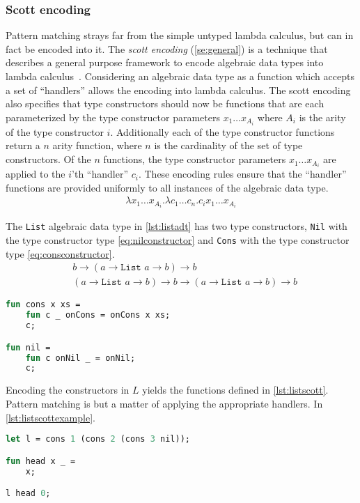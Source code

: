 \documentclass[11pt,oneside,a4paper]{report}
\begin{document}
\subsubsection{Scott encoding}
Pattern matching strays far from the simple untyped lambda calculus, but can in fact be encoded into it.
The \textit{scott encoding} (\autoref{se:general}) is a technique that describes a general purpose framework to encode algebraic data types into lambda calculus~\cite{scott1962system}.
Considering an algebraic data type as a function which accepts a set of ``handlers'' allows the encoding into lambda calculus.
The scott encoding  also specifies that type constructors should now be functions that are each parameterized by the type constructor parameters $x_1 \dots x_{A_i}$ where $A_i$ is the arity of the type constructor $i$.
Additionally each of the type constructor functions return a $n$ arity function, where $n$ is the cardinality of the set of type constructors.
Of the $n$ functions, the type constructor parameters $x_1 \dots x_{A_i}$ are applied to the $i$'th ``handler'' $c_i$.
These encoding rules ensure that the ``handler'' functions are provided uniformly to all instances of the algebraic data type.
\begin{align}
    \lambda x_1 \dots x_{A_i}. \lambda c_1 \dots c_n. c_i x_1 \dots x_{A_i}
\label{se:general}
\end{align}
\begin{exmp}
   The \texttt{List} algebraic data type in \autoref{lst:listadt} has two type constructors, \texttt{Nil} with the type constructor type \autoref{eq:nilconstructor} and \texttt{Cons} with the type constructor type \autoref{eq:consconstructor}.
\begin{align}
   &b \rightarrow (a \rightarrow \texttt{List } a \rightarrow b) \rightarrow b
   \label{eq:nilconstructor}\\
   &(a \rightarrow \texttt{List } a \rightarrow b) \rightarrow b \rightarrow (a \rightarrow \texttt{List } a \rightarrow b) \rightarrow b
   \label{eq:consconstructor}
\end{align}
\begin{lstlisting}[language=ML,caption={List algebraic data type implementation},label={lst:listscott}]
fun cons x xs = 
    fun c _ onCons = onCons x xs;
    c;

fun nil = 
    fun c onNil _ = onNil;
    c;
\end{lstlisting}
Encoding the constructors in $L$ yields the functions defined in \autoref{lst:listscott}.
Pattern matching is but a matter of applying the appropriate handlers.
In \autoref{lst:listscottexample}.
\begin{lstlisting}[language=ML,caption={Example of scott encoded list algebraic data type},label={lst:listscottexample}]
let l = cons 1 (cons 2 (cons 3 nil));

fun head x _ = 
    x;

l head 0;
\end{lstlisting}
\end{exmp}
\end{document}
